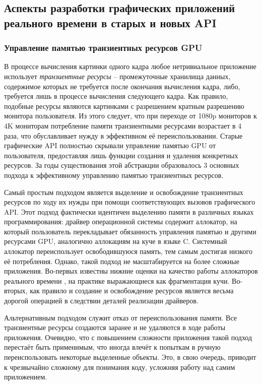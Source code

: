 \subsection{Аспекты разработки графических приложений реального времени в старых и новых API}
\subsubsection*{Управление памятью транзиентных ресурсов GPU}
В процессе вычисления картинки одного кадра любое нетривиальное приложение использует \textit{транзиентные ресурсы} -- промежуточные хранилища данных, содержимое которых не требуется после окончания вычисления кадра, либо, требуется лишь в процессе вычисления следующего кадра.
Как правило, подобные ресурсы являются картинками с разрешением кратным разрешению монитора пользователя.
Из этого следует, что при переходе от 1080p мониторов к 4K мониторам потребление памяти транзиентными ресурсами возрастает в 4 раза, что обуславливает нужду в эффективном её переиспользовании.
Старые графические API полностью скрывали управление памятью GPU от пользователя, предоставляя лишь функции создания и удаления конкретных ресурсов.
За годы существования этой абстракции образовалось 3 основных подхода к эффективному управлению памятью транзиентных ресурсов.

Самый простым подходом является выделение и освобождение транзиентных ресурсов по ходу их нужды при помощи соответствующих вызовов графического API.
Этот подход фактически идентичен выделению памяти в различных языках программирования: драйвер операционной системы содержит аллокатор, на который пользователь перекладывает обязанность управления памятью и другими ресурсами GPU, аналогично аллокациям на куче в языке C.
Системный аллокатор переиспользует освободившуюся память, тем самым достигая низкого её потребления.
Однако, такой подход не масштабируется на более сложные приложения. Во-первых известны нижние оценки на качество работы аллокаторов реального времени , на практике выражающиеся как фрагментация кучи.
Во-вторых, как правило и создание и освобождение ресурсов является весьма дорогой операцией в следствии деталей реализации драйверов.

Альтернативным подходом служит отказ от переиспользования памяти. Все транзиентные ресурсы создаются заранее и не удаляются в ходе работы приложения. Очевидно, что с повышением сложности приложения такой подход перестаёт быть применимым, что иногда влечёт к попыткам в ручную переиспользовать некоторые выделенные объекты. Это, в свою очередь, приводит к чрезвычайно сложному для понимания коду, усложняя работу над самим приложением.

